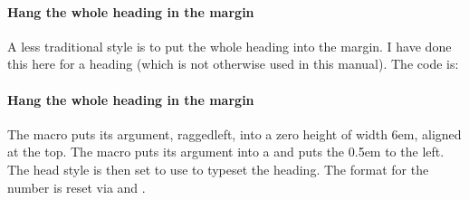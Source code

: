 



\newcommand{\marginbox}[1]{%
  \parbox[t][0pt]{6em}{\itshape\raggedleft\leavevmode #1}}
\newcommand{\marginhead}[1]{%
  {\llap{\marginbox{#1}\kern0.5em}}}
\setparaindent{0em}
\setafterparaskip{0em}
\setparaheadstyle{\marginhead}
\paragraph{Hang the whole heading in the margin}%
A less traditional style is to put the whole heading into the margin.
I have done this here for a \cmd{\paragraph} heading (which is not otherwise
used in this manual). The code is:
\begin{lcode}
\newcommand{\marginbox}[1]{%
  \parbox[t][0pt]{6em}{\itshape\raggedleft\leavevmode #1}}
\newcommand{\marginhead}[1]{%
  {\llap{\marginbox{#1}\kern0.5em}}}
\setparaindent{0em}
\setafterparaskip{0em}
\setparaheadstyle{\marginhead}
\paragraph{Hang the whole heading in the margin}%
\end{lcode}
The macro \cmd{\marginbox} puts its argument, raggedleft, into a zero height
\cmd{\parbox} of width 6em, aligned at the top.
The \cmd{\marginhead} macro puts its argument into a
\cmd{\marginbox} and puts the \cmd{\marginbox} 0.5em to the left.
The \cmd{\paragraph} head style is then set to use \cmd{\marginhead} to
typeset the heading. The format for the number is reset via
\cmd{\setparahook} and \cmd{\setsecnumformat}.


